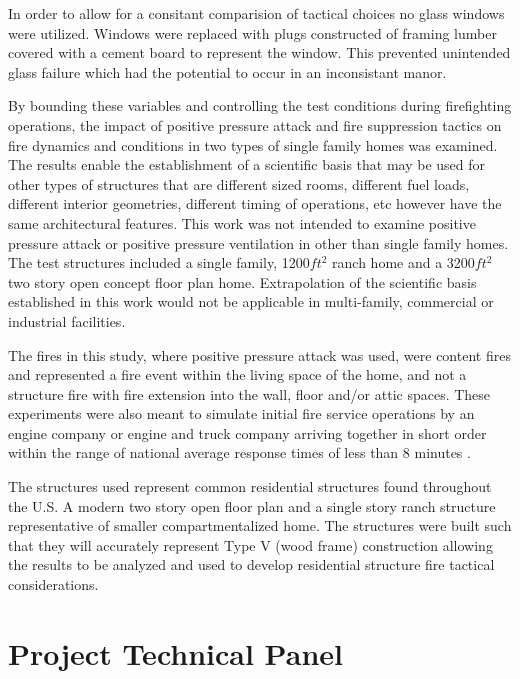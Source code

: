 \documentclass{article}
\begin{document}
In order to allow for a consitant comparision of tactical choices no glass windows were utilized. Windows were replaced with plugs constructed of framing lumber covered with a cement board to represent the window. This prevented unintended glass failure which had the potential to occur in an inconsistant manor.  

By bounding these variables and controlling the test conditions during firefighting operations, the impact of positive pressure attack and fire suppression tactics on fire dynamics and conditions in two types of single family homes was examined. The results enable the establishment of a scientific basis that may be used for other types of structures that are different sized rooms, different fuel loads, different interior geometries, different timing of operations, etc however have the same architectural features. This work was not intended to examine positive pressure attack or positive pressure ventilation in other than single family homes. The test structures included a single family, 1200$ft^2$ ranch home and a 3200$ft^2$ two story open concept floor plan home. Extrapolation of the scientific basis established in this work would not be applicable in multi-family, commercial or industrial facilities. 

The fires in this study, where positive pressure attack was used, were content fires and represented a fire event within the living space of the home, and not a structure fire with fire extension into the wall, floor and/or attic spaces. These experiments were also meant to simulate initial fire service operations by an engine company or engine and truck company arriving together in short order within the range of national average response times of less than 8 minutes \cite{USFA_Response_Times}.  

The structures used represent common residential structures found throughout the U.S. A modern two story open floor plan and a single story ranch structure representative of smaller compartmentalized home. The structures were built such that they will accurately represent Type V (wood frame) construction allowing the results to be analyzed and used to develop residential structure fire tactical considerations. 

\clearpage

\section{Project Technical Panel}
\end{document}
